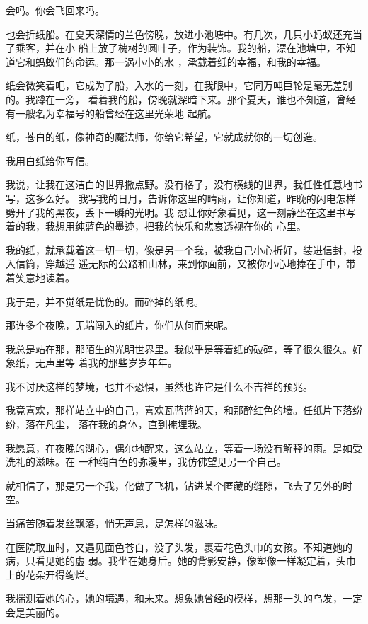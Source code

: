 \documentclass[12pt,a4paper]{article}
\begin{document}
		会吗。你会飞回来吗。

		也会折纸船。在夏天深情的兰色傍晚，放进小池塘中。有几次，几只小蚂蚁还充当了乘客，并在小
	船上放了槐树的圆叶子，作为装饰。我的船，漂在池塘中，不知道它和蚂蚁们的命运。那一涡小小的水
	，承载着纸的幸福，和我的幸福。

		纸会微笑着吧，它成为了船，入水的一刻，在我眼中，它同万吨巨轮是毫无差别的。我蹲在一旁，
	看着我的船，傍晚就深暗下来。那个夏天，谁也不知道，曾经有一艘名为幸福号的船曾经在这里光荣地
	起航。


		纸，苍白的纸，像神奇的魔法师，你给它希望，它就成就你的一切创造。

		我用白纸给你写信。

		我说，让我在这洁白的世界撒点野。没有格子，没有横线的世界，我任性任意地书写，这多么好。
	我写我的日月，告诉你这里的晴雨，让你知道，昨晚的闪电怎样劈开了我的黑夜，丢下一瞬的光明。我
	想让你好象看见，这一刻静坐在这里书写着的我，我想用纯蓝色的墨迹，把我的快乐和悲哀透视在你的
	心里。

		我的纸，就承载着这一切一切，像是另一个我，被我自己小心折好，装进信封，投入信筒，穿越遥
	遥无际的公路和山林，来到你面前，又被你小心地捧在手中，带着笑意地读着。


		我于是，并不觉纸是忧伤的。而碎掉的纸呢。


		那许多个夜晚，无端闯入的纸片，你们从何而来呢。

		我总是站在那，那陌生的光明世界里。我似乎是等着纸的破碎，等了很久很久。好象纸，无声里等
	着我的那些岁岁年年。

		我不讨厌这样的梦境，也并不恐惧，虽然也许它是什么不吉祥的预兆。

		我竟喜欢，那样站立中的自己，喜欢瓦蓝蓝的天，和那醉红色的墙。任纸片下落纷纷，落在凡尘，
	落在我的身体，直到掩埋我。

		我愿意，在夜晚的湖心，偶尔地醒来，这么站立，等着一场没有解释的雨。是如受洗礼的滋味。在
	一种纯白色的弥漫里，我仿佛望见另一个自己。


		就相信了，那是另一个我，化做了飞机，钻进某个匿藏的缝隙，飞去了另外的时空。

	\endwriting



		当痛苦随着发丝飘落，悄无声息，是怎样的滋味。

		在医院取血时，又遇见面色苍白，没了头发，裹着花色头巾的女孩。不知道她的病，只看见她的虚
	弱。我坐在她身后。她的背影安静，像塑像一样凝定着，头巾上的花朵开得绚烂。

		我揣测着她的心，她的境遇，和未来。想象她曾经的模样，想那一头的乌发，一定会是美丽的。
\end{document}
